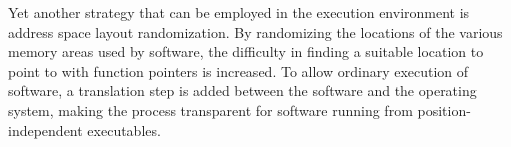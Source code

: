 Yet another strategy that can be employed in the execution environment
is address space layout randomization.
By randomizing the locations of the various memory areas used by software,
the difficulty in finding a suitable location to point to with function
pointers is increased.
To allow ordinary execution of software,
a translation step is added between the software and the operating system,
making the process transparent for software running from
position-independent executables.
